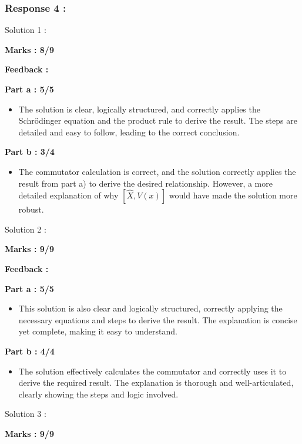 \documentclass[a4paper,11pt]{article}
\begin{document}
\subsubsection*{Response 4 :}

Solution 1 :

\textbf{Marks : 8/9}

\textbf{Feedback :}

\textbf{Part a : 5/5}

\begin{itemize}
    \item The solution is clear, logically structured, and correctly applies the Schrödinger equation and the product rule to derive the result. The steps are detailed and easy to follow, leading to the correct conclusion.
\end{itemize}


\textbf{Part b : 3/4}

\begin{itemize}
    \item The commutator calculation is correct, and the solution correctly applies the result from part a) to derive the desired relationship. However, a more detailed explanation of why $[\hat{X}, V(x)]$ would have made the solution more robust.
\end{itemize}


Solution 2 :

\textbf{Marks : 9/9}

\textbf{Feedback :}

\textbf{Part a : 5/5}

\begin{itemize}
    \item This solution is also clear and logically structured, correctly applying the necessary equations and steps to derive the result. The explanation is concise yet complete, making it easy to understand.
\end{itemize}


\textbf{Part b : 4/4}

\begin{itemize}
    \item The solution effectively calculates the commutator and correctly uses it to derive the required result. The explanation is thorough and well-articulated, clearly showing the steps and logic involved.
\end{itemize}




Solution 3 :

\textbf{Marks : 9/9}
\end{document}
